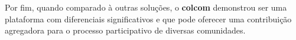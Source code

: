 Por fim, quando comparado à outras soluções, o \textbf{colcom} demonstrou ser uma plataforma com diferenciais significativos e que pode oferecer uma contribuição agregadora  para o processo participativo de diversas comunidades.

